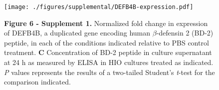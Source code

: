\documentclass[9pt,lineo]{elife}
\date{\today}
\title{}
\begin{document}
\begin{figure}
\begin{fullwidth}
\centering\texttt{[image: ./figures/supplemental/DEFB4B-expression.pdf]}
\caption*{\textbf{Figure 6 - Supplement 1. }Normalized fold change in expression of DEFB4B, a duplicated gene encoding human $\beta$-defensin 2 (BD-2) peptide, in each of the conditions indicated relative to PBS control treatment. \textbf{C} Concentration of BD-2 peptide in culture supernatant at 24 h as measured by ELISA in HIO cultures treated as indicated. \textit{P} values represents the results of a two-tailed Student's \textit{t}-test for the comparison indicated.}
\label{fig:fullwidth}
\end{fullwidth}
\end{figure}
\end{document}
